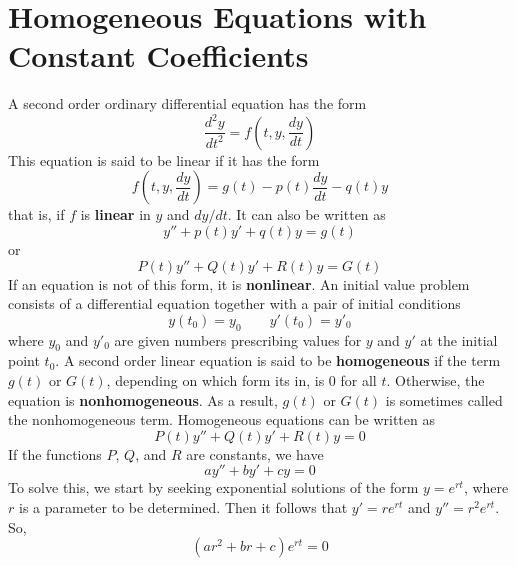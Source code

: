 \section{Homogeneous Equations with Constant Coefficients}
    A second order ordinary differential equation has the form
    \begin{equation*}
        \frac{d^2y}{dt^2} = f(t, y, \frac{dy}{dt})
    \end{equation*}
    This equation is said to be linear if it has the form
    \begin{equation*}
        f(t, y, \frac{dy}{dt}) = g(t) - p(t)\frac{dy}{dt} - q(t)y
    \end{equation*}
    that is, if $f$ is \textbf{linear} in $y$ and $dy/dt$. It can also be written as
    \begin{equation*}
        y'' + p(t)y' + q(t)y = g(t)
    \end{equation*}
    or
    \begin{equation*}
        P(t)y'' + Q(t)y' + R(t)y = G(t)
    \end{equation*}
    If an equation is not of this form, it is \textbf{nonlinear}. 
    \newline \indent
    An initial value problem consists of a differential equation together with a pair of initial conditions
    \begin{equation*}
        y(t_0) = y_0 \qquad y'(t_0) = y'_0
    \end{equation*}
    where $y_0$ and $y'_0$ are given numbers prescribing values for $y$ and $y'$ at the initial point $t_0$.
    \newline \indent
    A second order linear equation is said to be \textbf{homogeneous} if the term $g(t)$ or $G(t)$, depending on which form its in, is 0 for all $t$. Otherwise, the equation is \textbf{nonhomogeneous}. As a result, $g(t)$ or $G(t)$ is sometimes called the nonhomogeneous term. Homogeneous equations can be written as
    \begin{equation*}
        P(t)y'' + Q(t)y' + R(t)y = 0
    \end{equation*}
    If the functions $P$, $Q$, and $R$ are constants, we have
    \begin{equation*}
        ay'' + by' + cy = 0
    \end{equation*}
    To solve this, we start by seeking exponential solutions of the form $y = e^{rt}$, where $r$ is a parameter to be determined. Then it follows that $y' = re^{rt}$ and $y'' = r^2e^{rt}$. So,
    \begin{equation*}
        (ar^2 + br + c)e^{rt} = 0
    \end{equation*}
